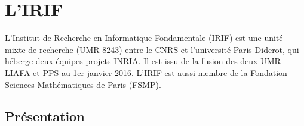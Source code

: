 \documentclass{article}
\begin{document}
\newpage

\section{L'IRIF}

L'Institut de Recherche en Informatique Fondamentale (IRIF) est une unité mixte de recherche (UMR 8243) entre le CNRS et l'université Paris Diderot, qui héberge deux équipes-projets INRIA. Il est issu de la fusion des deux UMR LIAFA et PPS au 1er janvier 2016. L'IRIF est aussi membre de la Fondation Sciences Mathématiques de Paris (FSMP). 

\subsection{Présentation}
\end{document}
